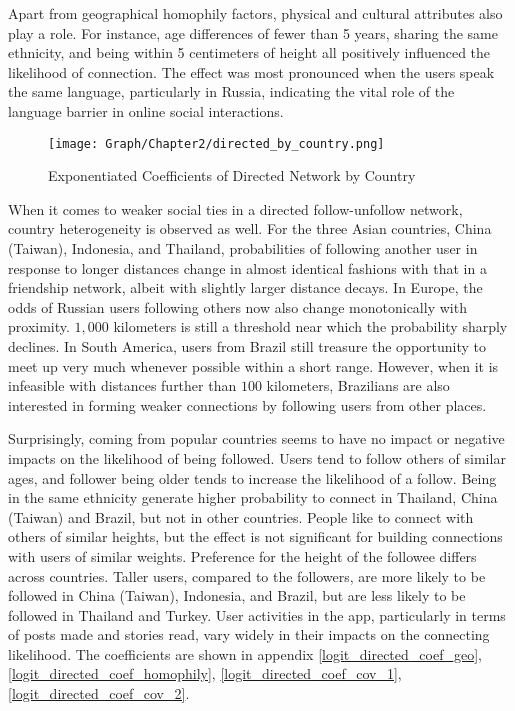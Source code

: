 Apart from geographical homophily factors, physical and cultural attributes also play a role. For instance, age differences of fewer than 5 years, sharing the same ethnicity, and being within 5 centimeters of height all positively influenced the likelihood of connection. The effect was most pronounced when the users speak the same language, particularly in Russia, indicating the vital role of the language barrier in online social interactions.

\begin{figure} \centering
  \texttt{[image: Graph/Chapter2/directed\_by\_country.png]}
    \caption{Exponentiated Coefficients of Directed Network by Country}
\end{figure}

When it comes to weaker social ties in a directed follow-unfollow network, country heterogeneity is observed as well. For the three Asian countries, China (Taiwan), Indonesia, and Thailand, probabilities of following another user in response to longer distances change in almost identical fashions with that in a friendship network, albeit with slightly larger distance decays. In Europe, the odds of Russian users following others now also change monotonically with proximity. $1,000$ kilometers is still a threshold near which the probability sharply declines. In South America, users from Brazil still treasure the opportunity to meet up very much whenever possible within a short range. However, when it is infeasible with distances further than $100$ kilometers, Brazilians are also interested in forming weaker connections by following users from other places.

Surprisingly, coming from popular countries seems to have no impact or negative impacts on the likelihood of being followed. Users tend to follow others of similar ages, and follower being older tends to increase the likelihood of a follow. Being in the same ethnicity generate higher probability to connect in Thailand, China (Taiwan) and Brazil, but not in other countries. People like to connect with others of similar heights, but the effect is not significant for building connections with users of similar weights. Preference for the height of the followee differs across countries. Taller users, compared to the followers, are more likely to be followed in China (Taiwan), Indonesia, and Brazil, but are less likely to be followed in Thailand and Turkey. User activities in the app, particularly in terms of posts made and stories read, vary widely in their impacts on the connecting likelihood.
The coefficients are shown in appendix \ref{logit_directed_coef_geo}, \ref{logit_directed_coef_homophily}, \ref{logit_directed_coef_cov_1}, \ref{logit_directed_coef_cov_2}.


